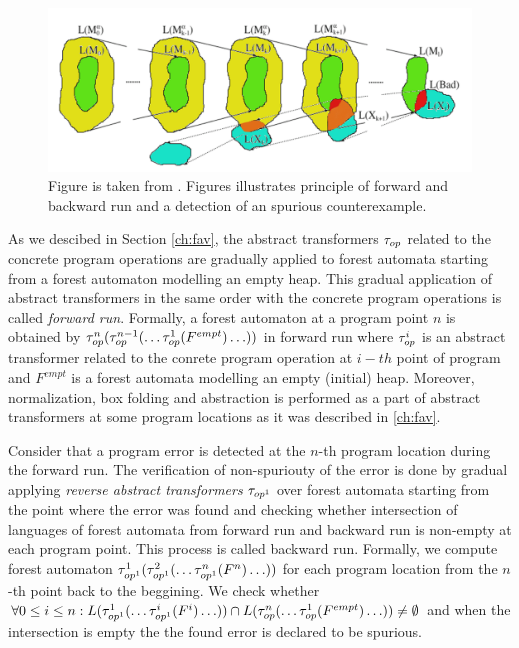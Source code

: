 \begin{figure}[t]
	\centering
	\includegraphics[width=1\linewidth]{fig/artmc.png}
	\caption{
		Figure is taken from \cite{artmc}.
		Figures illustrates principle of forward and backward run and
		a detection of an spurious counterexample.}
	\label{fig:bwrun}
\end{figure}

As we descibed in Section \ref{ch:fav}, the abstract transformers $\tau_{op}$
related to the concrete program operations are gradually applied to forest automata
starting from a forest automaton modelling an empty heap.
This gradual application of abstract transformers in the same order
with the concrete program operations is called \emph{forward run}.
Formally, a forest automaton at a program point $n$ is obtained by
$\tau_{op}^n(\tau_{op}^{n-1}(\ldots \tau_{op}^{1}(F^{empt}) \ldots))$ in forward run
where $\tau_{op}^i$ is an abstract transformer related to the conrete
program operation at $i-th$ point of program and $F^{empt}$ is
a forest automata modelling an empty (initial) heap.
Moreover, normalization, box folding and abstraction is performed
as a part of abstract transformers at some program locations as
it was described in \ref{ch:fav}.

Consider that a program error is detected at the $n$-th program location
during the forward run.
The verification of non-spuriouty of the error is done by gradual applying
\emph{reverse abstract transformers} $\tau_{op^1}$ over forest automata
starting from the point where the error was found
and checking whether intersection of languages of forest automata from forward run
and backward run is non-empty at each program point.
This process is called backward run.
Formally, we compute forest automaton $\tau_{op^1}^1(\tau_{op^1}^{2}(\ldots \tau_{op^1}^{n}(F^{n}) \ldots))$
for each program location from the $n$-th point back to the beggining.
We check whether $\forall 0 \leq i \leq n: L(\tau_{op^1}^1(\ldots \tau_{op^1}^{i}(F^{i}) \ldots)) \cap
L(\tau_{op}^n(\ldots \tau_{op}^{1}(F^{empt}) \ldots)) \neq \emptyset$
and when the intersection is empty the the found error is declared
to be spurious.

